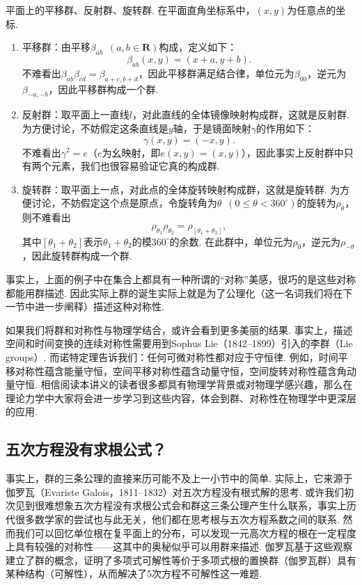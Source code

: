 \begin{example}{}{}
    平面上的平移群、反射群、旋转群. 在平面直角坐标系中，$(x,y)$为任意点的坐标.
    \begin{enumerate}
        \item 平移群：由平移$\beta_{ab}\enspace(a,b\in\mathbf{R})$构成，定义如下：
              \[\beta_{ab}(x,y)=(x+a,y+b).\]
              不难看出$\beta_{ab}\beta_{cd}=\beta_{a+c,b+d}$，因此平移群满足结合律，单位元为$\beta_{00}$，逆元为$\beta_{-a,-b}$，因此平移群构成一个群.

        \item 反射群：取平面上一直线$l$，对此直线的全体镜像映射构成群，这就是反射群. 为方便讨论，不妨假定这条直线是$y$轴，于是镜面映射$\gamma$的作用如下：
              \[\gamma(x,y)=(-x,y).\]
              不难看出$\gamma^2=e$（$e$为幺映射，即$e(x,y)=(x,y)$），因此事实上反射群中只有两个元素，我们也很容易验证它真的构成群.

        \item 旋转群：取平面上一点，对此点的全体旋转映射构成群，这就是旋转群. 为方便讨论，不妨假定这个点是原点，令旋转角为$\theta\enspace(0\leqslant\theta<360^\circ)$的旋转为$\rho_\theta$，则不难看出
              \[\rho_{\theta_1}\rho_{\theta_2}=\rho_{[\theta_1+\theta_2]},\]
              其中$[\theta_1+\theta_2]$表示$\theta_1+\theta_2$的模$360^\circ$的余数. 在此群中，单位元为$\rho_0$，逆元为$\rho_{-\theta}$，因此旋转群构成一个群.
    \end{enumerate}
\end{example}

事实上，上面的例子中在集合上都具有一种所谓的``对称''美感，很巧的是这些对称都能用群描述. 因此实际上群的诞生实际上就是为了公理化（这一名词我们将在下一节中进一步阐释）描述这种对称性.

如果我们将群和对称性与物理学结合，或许会看到更多美丽的结果. 事实上，描述空间和时间变换的连续对称性需要用到Sophus Lie（1842--1899）引入的李群（Lie groups）. 而诺特定理告诉我们：任何可微对称性都对应于守恒律. 例如，时间平移对称性蕴含能量守恒，空间平移对称性蕴含动量守恒，空间旋转对称性蕴含角动量守恒. 相信阅读本讲义的读者很多都具有物理学背景或对物理学感兴趣，那么在理论力学中大家将会进一步学习到这些内容，体会到群、对称性在物理学中更深层的应用.

\subsection{五次方程没有求根公式？}
事实上，群的三条公理的直接来历可能不及上一小节中的简单. 实际上，它来源于伽罗瓦（Evariste Galois，1811--1832）对五次方程没有根式解的思考. 或许我们初次见到很难想象五次方程没有求根公式会和群这三条公理产生什么联系，事实上历代很多数学家的尝试也与此无关，他们都在思考根与五次方程系数之间的联系. 然而我们可以回忆单位根在复平面上的分布，可以发现一元高次方程的根在一定程度上具有较强的对称性——这其中的奥秘似乎可以用群来描述. 伽罗瓦基于这些观察建立了群的概念，证明了多项式可解性等价于多项式根的置换群（伽罗瓦群）具有某种结构（可解性），从而解决了5次方程不可解性这一难题.

